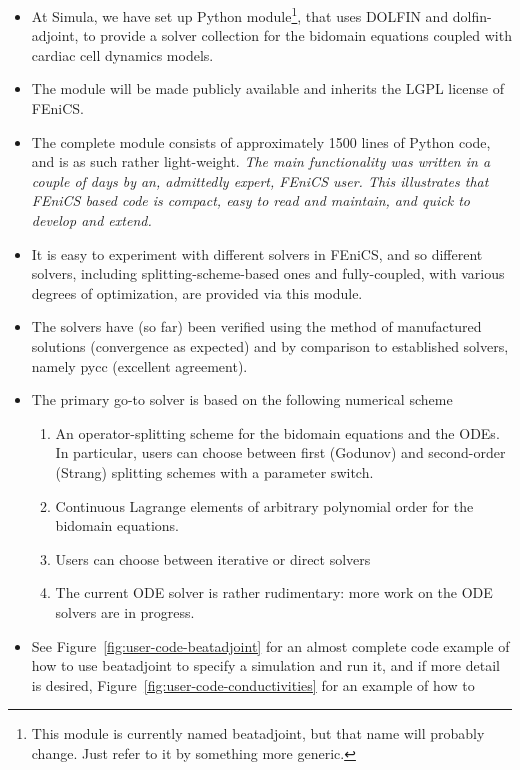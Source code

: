 \documentclass[a4paper, reqno]{amsart}
\numberwithin{equation}{section}
\begin{document}
\begin{itemize}
\item
  At Simula, we have set up Python module\footnote{This module is
    currently named beatadjoint, but that name will probably
    change. Just refer to it by something more generic.}, that uses
  DOLFIN and dolfin-adjoint, to provide a solver collection for the
  bidomain equations coupled with cardiac cell dynamics models.
\item
  The module will be made publicly available and inherits the LGPL
  license of FEniCS.
\item
  The complete module consists of approximately 1500 lines of Python
  code, and is as such rather light-weight. \emph{The main
    functionality was written in a couple of days by an, admittedly
    expert, FEniCS user. This illustrates that FEniCS based code is
    compact, easy to read and maintain, and quick to develop and
    extend.}
\item
  It is easy to experiment with different solvers in FEniCS, and so
  different solvers, including splitting-scheme-based ones and
  fully-coupled, with various degrees of optimization, are provided
  via this module.
\item
  The solvers have (so far) been verified using the method of
  manufactured solutions (convergence as expected) and by comparison
  to established solvers, namely pycc (excellent agreement).
\item
  The primary go-to solver is based on the following numerical scheme
  \begin{enumerate}
  \item
    An operator-splitting scheme for the bidomain equations and the
    ODEs. In particular, users can choose between first (Godunov) and
    second-order (Strang) splitting schemes with a parameter switch.
  \item
    Continuous Lagrange elements of arbitrary polynomial order for the
    bidomain equations.
  \item
    Users can choose between iterative or direct solvers
  \item
    The current ODE solver is rather rudimentary: more work on the ODE
    solvers are in progress.
  \end{enumerate}
\item See Figure~\ref{fig:user-code-beatadjoint} for an almost
  complete code example of how to use beatadjoint to specify a
  simulation and run it, and if more detail is desired,
  Figure~\ref{fig:user-code-conductivities} for an example of how to

\end{itemize}
\end{document}
